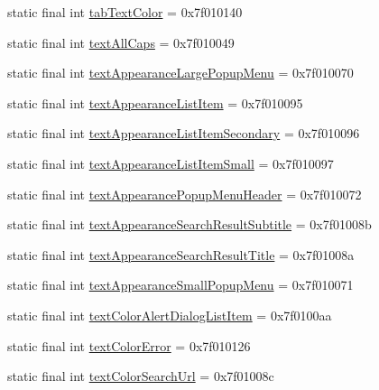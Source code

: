 \begin{CompactItemize}
\item 
static final int \hyperlink{classandroid_1_1support_1_1fragment_1_1_r_1_1attr_e7a372564f2c37b3a6fef45734446f53}{tabTextColor} = 0x7f010140
\item 
static final int \hyperlink{classandroid_1_1support_1_1fragment_1_1_r_1_1attr_fc7325f238ecff58fa028f6e7e9837a0}{textAllCaps} = 0x7f010049
\item 
static final int \hyperlink{classandroid_1_1support_1_1fragment_1_1_r_1_1attr_80adc5e9346a7ff1eabe9ba74014b947}{textAppearanceLargePopupMenu} = 0x7f010070
\item 
static final int \hyperlink{classandroid_1_1support_1_1fragment_1_1_r_1_1attr_c0a3a203cc98ea07d40bc324a95aad31}{textAppearanceListItem} = 0x7f010095
\item 
static final int \hyperlink{classandroid_1_1support_1_1fragment_1_1_r_1_1attr_c4570506c50136c7ab27cbce179926fb}{textAppearanceListItemSecondary} = 0x7f010096
\item 
static final int \hyperlink{classandroid_1_1support_1_1fragment_1_1_r_1_1attr_da86f6ce1511a5ec477bc092c7e64659}{textAppearanceListItemSmall} = 0x7f010097
\item 
static final int \hyperlink{classandroid_1_1support_1_1fragment_1_1_r_1_1attr_8f90f6337a0059e8ce5af548d7094798}{textAppearancePopupMenuHeader} = 0x7f010072
\item 
static final int \hyperlink{classandroid_1_1support_1_1fragment_1_1_r_1_1attr_5c3fa077731c2449e2a638c4930c0337}{textAppearanceSearchResultSubtitle} = 0x7f01008b
\item 
static final int \hyperlink{classandroid_1_1support_1_1fragment_1_1_r_1_1attr_60a08559e4b542bc737e52d434e854c4}{textAppearanceSearchResultTitle} = 0x7f01008a
\item 
static final int \hyperlink{classandroid_1_1support_1_1fragment_1_1_r_1_1attr_7c813c829e15924a46516336b845ad41}{textAppearanceSmallPopupMenu} = 0x7f010071
\item 
static final int \hyperlink{classandroid_1_1support_1_1fragment_1_1_r_1_1attr_53cfd69cdf25074c01ef95584ad554d6}{textColorAlertDialogListItem} = 0x7f0100aa
\item 
static final int \hyperlink{classandroid_1_1support_1_1fragment_1_1_r_1_1attr_7751ea5f1c3dbfbf62644807e15192f1}{textColorError} = 0x7f010126
\item 
static final int \hyperlink{classandroid_1_1support_1_1fragment_1_1_r_1_1attr_d7b8079a4100795699881420df3b06a4}{textColorSearchUrl} = 0x7f01008c
\item 

\end{CompactItemize}

